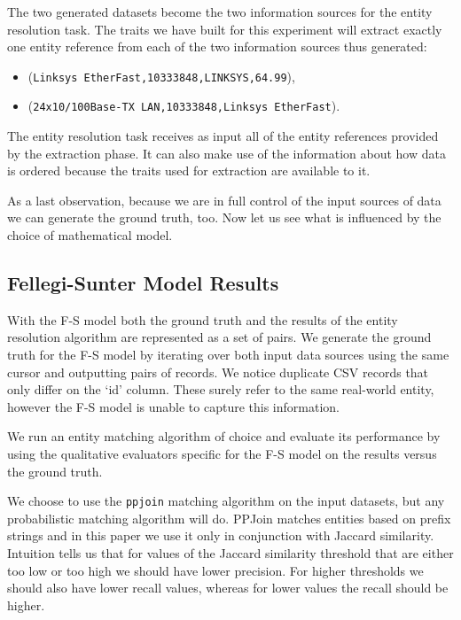 \documentclass[11pt]{article}
\begin{document}
    The two generated datasets become the two information sources for the entity
    resolution task.
    The traits we have built for this experiment will extract exactly one entity
    reference from each of the two information sources thus generated:
    \begin{itemize}
        \item (\texttt{Linksys EtherFast,10333848,LINKSYS,64.99}),
        \item (\texttt{24x10/100Base-TX LAN,10333848,Linksys EtherFast}).
    \end{itemize}

    The entity resolution task receives as input all of the entity references
    provided by the extraction phase.
    It can also make use of the information about how data is ordered because
    the traits used for extraction are available to it.

    As a last observation, because we are in full control of the input sources
    of data we can generate the ground truth, too.
    Now let us see what is influenced by the choice of mathematical model.

    \subsection{Fellegi-Sunter Model Results}
    
    With the F-S model both the ground truth and the results of the entity
    resolution algorithm are represented as a set of pairs.
    We generate the ground truth for the F-S model by iterating over both
    input data sources using the same cursor and outputting pairs of records.
    We notice duplicate CSV records that only differ on the `id' column.
    These surely refer to the same real-world entity, however the F-S model is
    unable to capture this information.

    We run an entity matching algorithm of choice and evaluate its performance
    by using the qualitative evaluators specific for the F-S model on the
    results versus the ground truth.
    
    We choose to use the \texttt{ppjoin}\cite{ppjoin} matching algorithm on the
    input datasets, but any probabilistic matching algorithm will do.
    PPJoin matches entities based on prefix strings and in this paper we use it
    only in conjunction with Jaccard similarity.
    Intuition tells us that for values of the Jaccard similarity threshold that
    are either too low or too high we should have lower precision.
    For higher thresholds we should also have lower recall values, whereas for
    lower values the recall should be higher.
\end{document}
